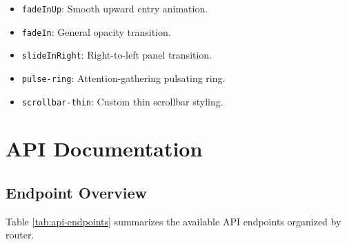 \documentclass[11pt,a4paper]{article}
\begin{document}
\begin{itemize}[leftmargin=2em]
    \item \texttt{fadeInUp}: Smooth upward entry animation.
    \item \texttt{fadeIn}: General opacity transition.
    \item \texttt{slideInRight}: Right-to-left panel transition.
    \item \texttt{pulse-ring}: Attention-gathering pulsating ring.
    \item \texttt{scrollbar-thin}: Custom thin scrollbar styling.
\end{itemize}

\newpage
\section{API Documentation}
\label{sec:api}

\subsection{Endpoint Overview}

Table \ref{tab:api-endpoints} summarizes the available API endpoints organized by router.
\end{document}

